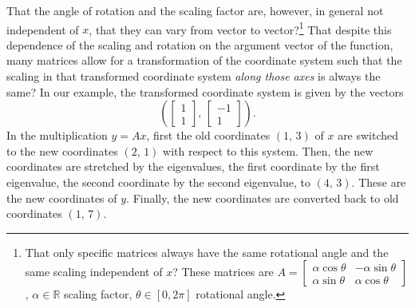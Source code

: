 \documentclass[10pt]{article}
\newcommand{\R}{\mathds{R}}
\begin{document}
That the angle of rotation and the scaling factor are, however, in general not independent of $x$, that they can vary from vector to vector?\footnote{That only specific matrices always have the same rotational angle and the same scaling independent of $x$? These matrices are $A=\left[\begin{array}{cc}
\alpha \cos\theta & -\alpha\sin\theta \\
\alpha \sin\theta & \alpha\cos\theta
\end{array}\right]$, $\alpha\in\R$ scaling factor, $\theta\in [0, 2\pi]$ rotational angle.}
That despite this dependence of the scaling and rotation on the argument vector of the function, many matrices allow for a transformation of the coordinate system such that the scaling in that transformed coordinate system \textit{along those axes} is always the same? In our example, the transformed coordinate system is given by the vectors
\[
\left(\left[\begin{array}{c} 1 \\ 1\end{array}\right],\, \left[\begin{array}{c} -1 \\ 1\end{array}\right]\right).
\]
In the multiplication $y=Ax$, first the old coordinates $(1,\, 3)$ of
$x$ are switched to the new coordinates $(2,\, 1)$ with respect to this system.  Then, the new coordinates are stretched by the eigenvalues, the first coordinate by the first eigenvalue, the second coordinate by the second eigenvalue, to $(4,\, 3)$.  These are the new coordinates of $y$. Finally, the
new coordinates are converted back to old coordinates $(1,\, 7)$.
\end{document}
